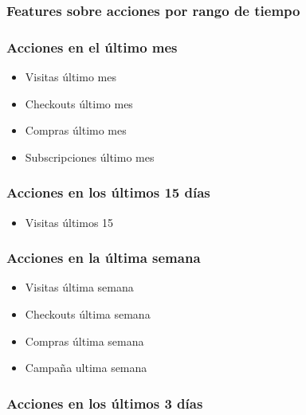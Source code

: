 \documentclass[a4paper ,12pt]{article}
\begin{document}
\subsubsection{ Features sobre acciones por rango de tiempo }

		
		\subsubsection{Acciones en el último mes}
	
		\begin{itemize}
		 	
		\item Visitas último mes
		
		\item Checkouts último mes
		
		\item Compras último mes
		
		\item Subscripciones último mes
		\end{itemize}
		
	
		

		\subsubsection{Acciones en los últimos 15 días}		
		
		\begin{itemize}
			\item 	Visitas últimos 15
		\end{itemize}
		


		\subsubsection{Acciones en la última semana}
			
			\begin{itemize}
				\item  Visitas última semana
				\item  Checkouts última semana
				\item  Compras última semana 
				\item Campaña ultima semana
			\end{itemize}
			

		\subsubsection{Acciones en los últimos 3 días}
		
\end{document}
